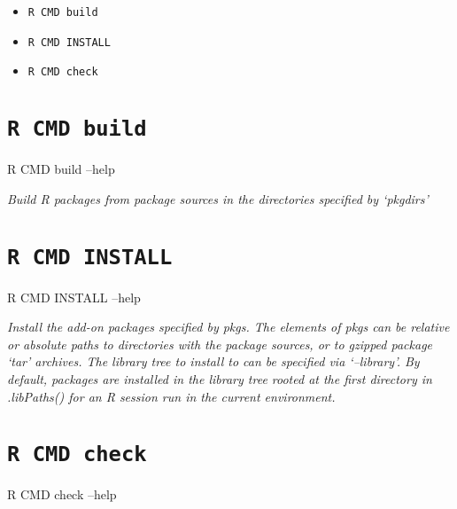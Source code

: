 \documentclass[]{book}
\newenvironment{Shaded}{\begin{snugshade}}{\end{snugshade}}
\newcommand{\NormalTok}[1]{{#1}}
\theoremstyle{definition}
\theoremstyle{definition}
\theoremstyle{definition}
\theoremstyle{remark}
\begin{document}
\begin{itemize}
\item
  \texttt{R\ CMD\ build}
\item
  \texttt{R\ CMD\ INSTALL}
\item
  \texttt{R\ CMD\ check}
\end{itemize}

\section{\texorpdfstring{\texttt{R\ CMD\ build}}{R CMD build}}\label{r-cmd-build}

\begin{Shaded}
\begin{Highlighting}[]
\NormalTok{R CMD build --help}
\end{Highlighting}
\end{Shaded}

\emph{Build R packages from package sources in the directories specified
by `pkgdirs'}

\section{\texorpdfstring{\texttt{R\ CMD\ INSTALL}}{R CMD INSTALL}}\label{r-cmd-install}

\begin{Shaded}
\begin{Highlighting}[]
\NormalTok{R CMD INSTALL --help}
\end{Highlighting}
\end{Shaded}

\emph{Install the add-on packages specified by pkgs. The elements of
pkgs can be relative or absolute paths to directories with the package
sources, or to gzipped package `tar' archives. The library tree to
install to can be specified via `--library'. By default, packages are
installed in the library tree rooted at the first directory in
.libPaths() for an R session run in the current environment.}

\section{\texorpdfstring{\texttt{R\ CMD\ check}}{R CMD check}}\label{r-cmd-check}

\begin{Shaded}
\begin{Highlighting}[]
\NormalTok{R CMD check --help}
\end{Highlighting}
\end{Shaded}
\end{document}
